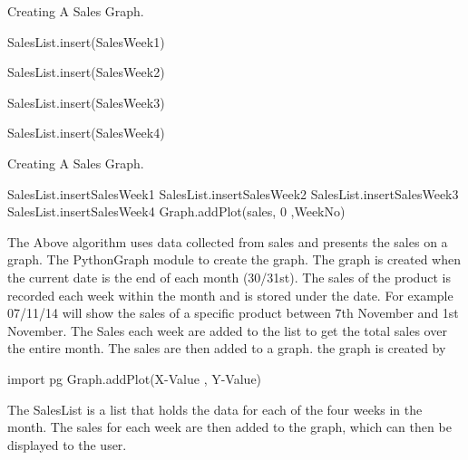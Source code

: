 \begin{algorithm}[H]
\label{fig:Creating A Sales Graph  Pseudo code}
\caption{Creating A Sales Graph.}
\begin{algorithmic}[1]

{SalesList.insert(SalesWeek1)}

{SalesList.insert(SalesWeek2)}

{SalesList.insert(SalesWeek3)}

{SalesList.insert(SalesWeek4)}
\EndFor
\end{algorithmic}
\end{algorithm}

\begin{algorithm}[H]
\label{fig:repeat_pseudo_example}
\caption{Creating A Sales Graph.}
\begin{algorithmic}[1]
SalesList.insert{SalesWeek1}
SalesList.insert{SalesWeek2}
SalesList.insert{SalesWeek3}
SalesList.insert{SalesWeek4}
Graph.addPlot(sales, 0 ,WeekNo)
\EndFor
\EndFunction
\end{algorithmic}
\end{algorithm}

The Above algorithm uses data collected from sales  and presents the sales on a graph. The PythonGraph module to create the graph. The graph is created when the current date is the end of each month (30/31st). The sales of the product is recorded each week within the month and is stored under the date. For example 07/11/14 will show the sales of a specific product between 7th November and 1st November. The Sales each week are added to the list to get the total sales over the entire month. The sales are then added to a graph. the graph is created by 
\begin{python}
import pg
Graph.addPlot(X-Value , Y-Value)
\end{python}

 The SalesList is a list that holds the data for each of the four weeks in the month. The sales for each week are then added to the graph, which can then be displayed to the user.


